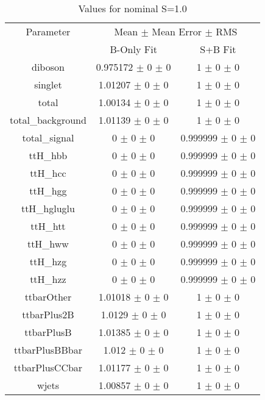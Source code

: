 \begin{table}
\centering
\caption{Values for nominal S=1.0}
\begin{tabular}{ccc}
\toprule
Parameter 	& \multicolumn{2}{c}{Mean $\pm$ Mean Error $\pm$ RMS}\\
 	& B-Only Fit & S+B Fit\\
\midrule
diboson 	& \num{0.975172} $\pm$ \num{0} $\pm$ \num{0} 	& \num{1} $\pm$ \num{0} $\pm$ \num{0}\\
singlet 	& \num{1.01207} $\pm$ \num{0} $\pm$ \num{0} 	& \num{1} $\pm$ \num{0} $\pm$ \num{0}\\
total 	& \num{1.00134} $\pm$ \num{0} $\pm$ \num{0} 	& \num{1} $\pm$ \num{0} $\pm$ \num{0}\\
total\_background 	& \num{1.01139} $\pm$ \num{0} $\pm$ \num{0} 	& \num{1} $\pm$ \num{0} $\pm$ \num{0}\\
total\_signal 	& \num{0} $\pm$ \num{0} $\pm$ \num{0} 	& \num{0.999999} $\pm$ \num{0} $\pm$ \num{0}\\
ttH\_hbb 	& \num{0} $\pm$ \num{0} $\pm$ \num{0} 	& \num{0.999999} $\pm$ \num{0} $\pm$ \num{0}\\
ttH\_hcc 	& \num{0} $\pm$ \num{0} $\pm$ \num{0} 	& \num{0.999999} $\pm$ \num{0} $\pm$ \num{0}\\
ttH\_hgg 	& \num{0} $\pm$ \num{0} $\pm$ \num{0} 	& \num{0.999999} $\pm$ \num{0} $\pm$ \num{0}\\
ttH\_hgluglu 	& \num{0} $\pm$ \num{0} $\pm$ \num{0} 	& \num{0.999999} $\pm$ \num{0} $\pm$ \num{0}\\
ttH\_htt 	& \num{0} $\pm$ \num{0} $\pm$ \num{0} 	& \num{0.999999} $\pm$ \num{0} $\pm$ \num{0}\\
ttH\_hww 	& \num{0} $\pm$ \num{0} $\pm$ \num{0} 	& \num{0.999999} $\pm$ \num{0} $\pm$ \num{0}\\
ttH\_hzg 	& \num{0} $\pm$ \num{0} $\pm$ \num{0} 	& \num{0.999999} $\pm$ \num{0} $\pm$ \num{0}\\
ttH\_hzz 	& \num{0} $\pm$ \num{0} $\pm$ \num{0} 	& \num{0.999999} $\pm$ \num{0} $\pm$ \num{0}\\
ttbarOther 	& \num{1.01018} $\pm$ \num{0} $\pm$ \num{0} 	& \num{1} $\pm$ \num{0} $\pm$ \num{0}\\
ttbarPlus2B 	& \num{1.0129} $\pm$ \num{0} $\pm$ \num{0} 	& \num{1} $\pm$ \num{0} $\pm$ \num{0}\\
ttbarPlusB 	& \num{1.01385} $\pm$ \num{0} $\pm$ \num{0} 	& \num{1} $\pm$ \num{0} $\pm$ \num{0}\\
ttbarPlusBBbar 	& \num{1.012} $\pm$ \num{0} $\pm$ \num{0} 	& \num{1} $\pm$ \num{0} $\pm$ \num{0}\\
ttbarPlusCCbar 	& \num{1.01177} $\pm$ \num{0} $\pm$ \num{0} 	& \num{1} $\pm$ \num{0} $\pm$ \num{0}\\
wjets 	& \num{1.00857} $\pm$ \num{0} $\pm$ \num{0} 	& \num{1} $\pm$ \num{0} $\pm$ \num{0}\\
\bottomrule
\end{tabular}
\end{table}